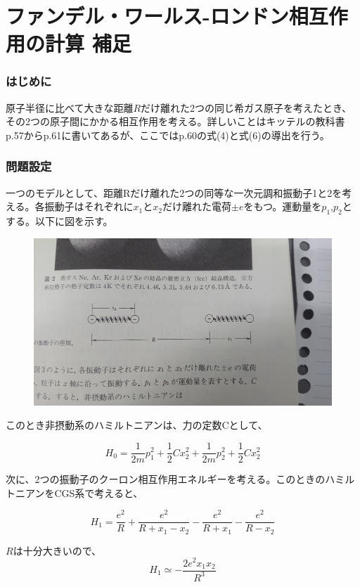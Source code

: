 \documentclass{jsarticle}
\begin{document}
\part{ファンデル・ワールス-ロンドン相互作用の計算 補足}
	\section{はじめに}
	原子半径に比べて大きな距離$R$だけ離れた2つの同じ希ガス原子を考えたとき、その2つの原子間にかかる相互作用を考える。詳しいことはキッテルの教科書p.57からp.61に書いてあるが、ここではp.60の式(4)と式(6)の導出を行う。

	\section{問題設定}
	一つのモデルとして、距離Rだけ離れた2つの同等な一次元調和振動子1と2を考える。各振動子はそれぞれに$x_{1}$と$x_{2}$だけ離れた電荷$\pm e$をもつ。運動量を$p_{1}$,$p_2$とする。以下に図を示す。\\
	\begin{figure}[H]
		\centering
		\includegraphics[width=0.7\linewidth]{DSC_0001}
		\caption{}
		\label{fig:dsc0001}
	\end{figure}

	このとき非摂動系のハミルトニアンは、力の定数Cとして、

		\begin{equation}
			H_{0}=\frac{1}{2m}p_{1}^{2}+\frac{1}{2}Cx_{2}^{2}+\frac{1}{2m}p_{2}^{2}+\frac{1}{2}Cx_{2}^{2}
		\end{equation}

	次に、2つの振動子のクーロン相互作用エネルギーを考える。このときのハミルトニアンをCGS系で考えると、

		\begin{equation}
			H_{1}=\frac{e^{2}}{R}+\frac{e^{2}}{R+x_{1}-x_{2}}-\frac{e^{2}}{R+x_{1}}-\frac{e^{2}}{R-x_{2}}
		\end{equation}

	$R$は十分大きいので、
		\begin{equation}
			H_{1}\simeq-\frac{2e^{2}x_{1}x_{2}}{R^{3}}
		\end{equation}
\end{document}
